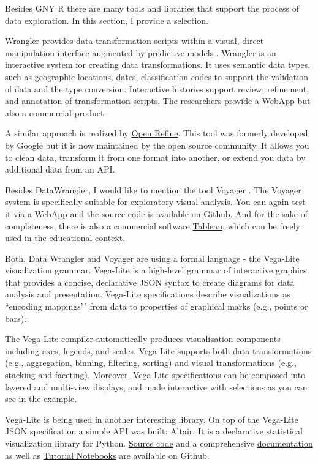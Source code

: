 \documentclass[
]{book}
\begin{document}
Besides GNY R there are many tools and libraries that support the process of data exploration. In this section, I provide a selection.

Wrangler provides data-transformation scripts within a visual, direct manipulation interface augmented by predictive models \citep{kandel2011wrangler}. Wrangler is an interactive system for creating data transformations. It uses semantic data types, such as geographic locations, dates, classification codes to support the validation of data and the type conversion. Interactive histories support review, refinement, and annotation of transformation scripts. The researchers provide a WebApp but also a \href{https://www.trifacta.com/start-wrangling/}{commercial product}.

A similar approach is realized by \href{https://openrefine.org/}{Open Refine}. This tool was formerly developed by Google but it is now maintained by the open source community. It allows you to clean data, transform it from one format into another, or extend you data by additional data from an API.

Besides DataWrangler, I would like to mention the tool Voyager \citep{wongsuphasawat2015voyager}. The Voyager system is specifically suitable for exploratory visual analysis. You can again test it via a \href{https://vega.github.io/voyager/}{WebApp} and the source code is available on \href{https://github.com/vega/voyager}{Github}. And for the sake of completeness, there is also a commercial software \href{https://www.tableau.com/}{Tableau}, which can be freely used in the educational context.

Both, Data Wrangler and Voyager are using a formal language - the Vega-Lite visualization grammar. Vega-Lite is a high-level grammar of interactive graphics that provides a concise, declarative JSON syntax to create diagrams for data analysis and presentation. Vega-Lite specifications describe visualizations as ``encoding mappings'\,' from data to properties of graphical marks (e.g., points or bars).

The Vega-Lite compiler automatically produces visualization components including axes, legends, and scales. Vega-Lite supports both data transformations (e.g., aggregation, binning, filtering, sorting) and visual transformations (e.g., stacking and faceting). Moreover, Vega-Lite specifications can be composed into layered and multi-view displays, and made interactive with selections as you can see in the example.

Vega-Lite is being used in another interesting library. On top of the Vega-Lite JSON specification a simple API was built: Altair. It is a declarative statistical visualization library for Python. \href{https://github.com/altair-viz/altair}{Source code} and a comprehensive \href{https://altair-viz.github.io/}{documentation} as well as \href{github.com/altair-viz/altair_notebooks}{Tutorial Notebooks} are available on Github.
\end{document}

